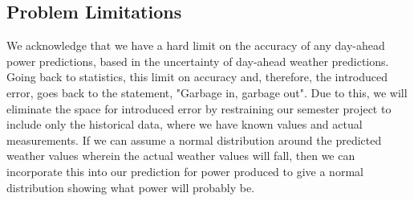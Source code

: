 \documentclass[sigconf]{acmart}
\begin{document}
\subsection{Problem Limitations}
We acknowledge that we have a hard limit on the accuracy of any day-ahead power predictions, based in the uncertainty of day-ahead weather predictions.  Going back to statistics, this limit on accuracy and, therefore, the introduced error, goes back to the statement, "Garbage in, garbage out".  Due to this, we will eliminate the space for introduced error by restraining our semester project to include only the historical data, where we have known values and actual measurements.  If we can assume a normal distribution around the predicted weather values wherein the actual weather values will fall, then we can incorporate this into our prediction for power produced to give a normal distribution showing what power will probably be.

\end{document}
